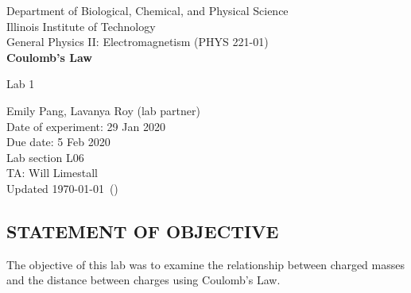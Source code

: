 \documentclass [12pt, letterpaper, twoside] {article}
\begin{document}
\begin {titlepage}
\begin {center}
Department of Biological, Chemical, and Physical Science\\
\vspace {0.1cm}
Illinois Institute of Technology\\
\vspace {0.1cm}
General Physics II: Electromagnetism (PHYS 221-01)\\
\vspace* {\fill}
\begingroup
\Large
\textbf {Coulomb's Law}
\vspace {0.35cm}

\normalsize
Lab 1
\vspace {1.5cm}
\endgroup
\vspace* {\fill}
\end {center}

\vspace*{\fill}
\begin {flushright}
\footnotesize
Emily Pang, Lavanya Roy (lab partner) \\
Date of experiment: 29 Jan 2020 \\
Due date: 5 Feb 2020 \\
Lab section L06 \\
TA: Will Limestall \\
Updated \usdate\today~(\currenttime)
\end {flushright}
\end {titlepage}
\subsection* {STATEMENT OF OBJECTIVE}
The objective of this lab was to examine the relationship between charged masses and the distance between charges using Coulomb's Law. \\
\end{document}
